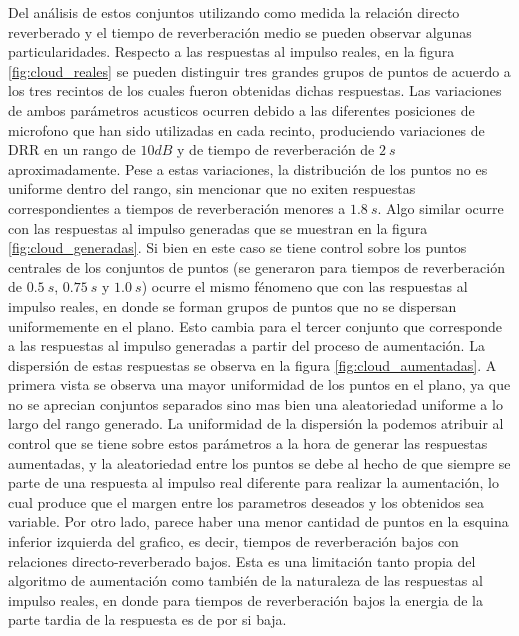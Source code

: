 Del análisis de estos conjuntos utilizando como medida la relación directo reverberado  y el tiempo de reverberación medio se pueden observar algunas particularidades. Respecto a las respuestas al impulso reales, en la figura \ref{fig:cloud_reales} se pueden distinguir tres grandes grupos de puntos de acuerdo a los tres recintos de los cuales fueron obtenidas dichas respuestas. Las variaciones de ambos parámetros acusticos ocurren debido a las diferentes posiciones de microfono que han sido utilizadas en cada recinto, produciendo variaciones de DRR en un rango de $10 dB$ y de tiempo de reverberación de $2 \ s$ aproximadamente. Pese a estas variaciones, la distribución de los puntos no es uniforme dentro del rango, sin mencionar que no exiten respuestas correspondientes a tiempos de reverberación menores a $1.8 \ s$. Algo similar ocurre con las respuestas al impulso generadas que se muestran en la figura \ref{fig:cloud_generadas}. Si bien en este caso se tiene control sobre los puntos centrales de los conjuntos de puntos (se generaron para tiempos de reverberación de $0.5 \ s$, $0.75 \ s$ y $1.0 \ s$) ocurre el mismo fénomeno que con las respuestas al impulso reales, en donde se forman grupos de puntos que no se dispersan uniformemente en el plano. Esto cambia para el tercer conjunto que corresponde a las respuestas al impulso generadas a partir del proceso de aumentación. La dispersión de estas respuestas se observa en la figura \ref{fig:cloud_aumentadas}. A primera vista se observa una mayor uniformidad de los puntos en el plano, ya que no se aprecian conjuntos separados sino mas bien una aleatoriedad uniforme a lo largo del rango generado. La uniformidad de la dispersión la podemos atribuir al control que se tiene sobre estos parámetros a la hora de generar las respuestas aumentadas, y la aleatoriedad entre los puntos se debe al hecho de que siempre se parte de una respuesta al impulso real diferente para realizar la aumentación, lo cual produce que el margen entre los parametros deseados y los obtenidos sea variable. Por otro lado, parece haber una menor cantidad de puntos en la esquina inferior izquierda del grafico, es decir, tiempos de reverberación bajos con relaciones directo-reverberado bajos. Esta es una limitación tanto propia del algoritmo de aumentación como también de la naturaleza de las respuestas al impulso reales, en donde para tiempos de reverberación bajos la energia de la parte tardia de la respuesta es de por si baja. 




